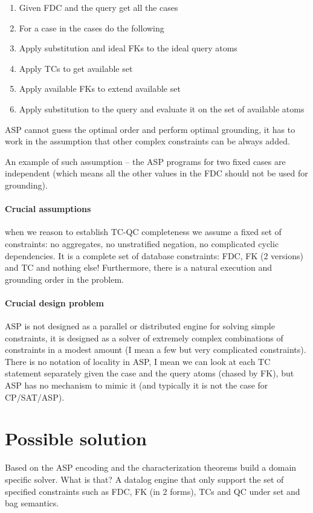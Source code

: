 \documentclass{article}
\begin{document}
\begin{enumerate}
  \item Given FDC and the query get all the cases
  \item For a case in the cases do the following
  \item Apply substitution and ideal FKs to the ideal query atoms
  \item Apply TCs to get available set
  \item Apply available FKs to extend available set
  \item Apply substitution to the query and evaluate it on the set of available atoms
\end{enumerate}

ASP cannot guess the optimal order and perform optimal grounding, it has to work in the assumption that other complex constraints can be always added.

An example of such assumption -- the ASP programs for two fixed cases are independent (which means all the other values in the FDC should not be used for grounding). 

\paragraph{Crucial assumptions} when we reason to establish TC-QC completeness we assume a fixed set of constraints: no aggregates, no unstratified negation, no complicated cyclic dependencies. It is a complete set of database constraints: FDC, FK (2 versions) and TC and nothing else! Furthermore, there is a natural execution and grounding order in the problem.

\paragraph{Crucial design problem} ASP is not designed as a parallel or distributed engine for solving simple constraints, it is designed as a solver of extremely complex combinations of constraints in a modest amount (I mean a few but very complicated constraints). There is no notation of locality in ASP, I mean we can look at each TC statement separately given the case and the query atoms (chased by FK), but ASP has no mechanism to mimic it (and typically it is not the case for CP/SAT/ASP).

\section{Possible solution} 
Based on the ASP encoding and the characterization theorems build a domain specific solver. What is that? A datalog engine that only support the set of specified constraints such as FDC, FK (in 2 forms), TCs and QC under set and bag semantics.
\end{document}
